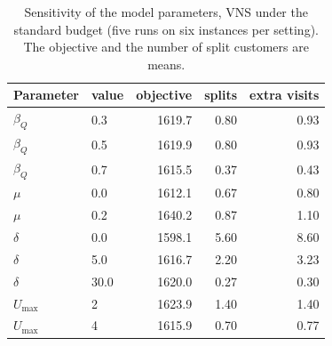 \begin{table}[tb]
\centering
\caption{Sensitivity of the model parameters, VNS under the standard budget (five runs on six instances per setting). The objective and the number of split customers are means.}
\label{tab:sens}
\small
\begin{tabular}{@{}llrrr@{}}
\toprule
Parameter & value & objective & splits & extra visits \\
\midrule
$\beta_Q$ & 0.3 & 1619.7 & 0.80 & 0.93 \\
$\beta_Q$ & 0.5 & 1619.9 & 0.80 & 0.93 \\
$\beta_Q$ & 0.7 & 1615.5 & 0.37 & 0.43 \\
\midrule
$\mu$ & 0.0 & 1612.1 & 0.67 & 0.80 \\
$\mu$ & 0.2 & 1640.2 & 0.87 & 1.10 \\
\midrule
$\delta$ & 0.0 & 1598.1 & 5.60 & 8.60 \\
$\delta$ & 5.0 & 1616.7 & 2.20 & 3.23 \\
$\delta$ & 30.0 & 1620.0 & 0.27 & 0.30 \\
\midrule
$U_{\max}$ & 2 & 1623.9 & 1.40 & 1.40 \\
$U_{\max}$ & 4 & 1615.9 & 0.70 & 0.77 \\
\bottomrule
\end{tabular}
\end{table}
